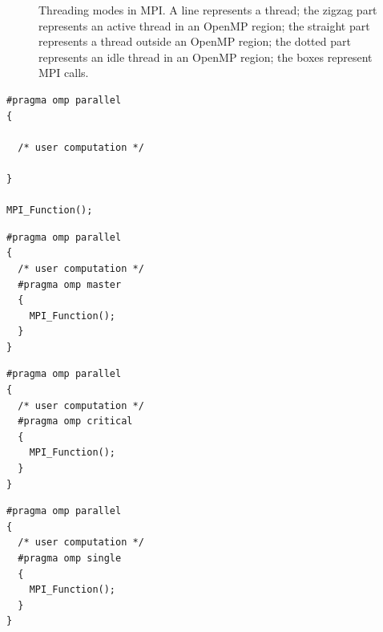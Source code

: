 \begin{figure}[h]
{    \label{fig:th_mode_mt}
  }
  \hspace{0.05\columnwidth}
  \vspace{-2.0ex}
  \caption{Threading modes in MPI.  A line represents a thread; the
    zigzag part represents an active thread in an OpenMP region; the
    straight part represents a thread outside an OpenMP region; the
    dotted part represents an idle thread in an OpenMP region; the
    boxes represent MPI calls.}
  \label{fig:th_modes}
  \vspace{-3.0ex}
\end{figure}


\newsavebox\mpiOutsideBox
\begin{lrbox}{\mpiOutsideBox}
\begin{lstlisting}[linewidth=0.45\columnwidth]
#pragma omp parallel
{

  /* user computation */

}

MPI_Function();
\end{lstlisting}
\end{lrbox}

\newsavebox\mpiInsideMasterBox
\begin{lrbox}{\mpiInsideMasterBox}
\begin{lstlisting}[linewidth=0.45\columnwidth]
#pragma omp parallel
{
  /* user computation */
  #pragma omp master
  {
    MPI_Function();
  }
}
\end{lstlisting}
\end{lrbox}

\newsavebox\mpiInsideCriticalBox
\begin{lrbox}{\mpiInsideCriticalBox}
\begin{lstlisting}[linewidth=0.45\columnwidth]
#pragma omp parallel
{
  /* user computation */
  #pragma omp critical
  {
    MPI_Function();
  }
}
\end{lstlisting}
\end{lrbox}

\newsavebox\mpiInsideSingleBox
\begin{lrbox}{\mpiInsideSingleBox}
\begin{lstlisting}[linewidth=0.45\columnwidth]
#pragma omp parallel
{
  /* user computation */
  #pragma omp single
  {
    MPI_Function();
  }
}
\end{lstlisting}
\end{lrbox}

